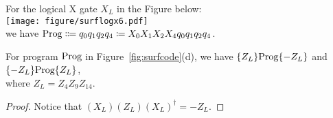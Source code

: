 \begin{program} For the logical X gate $X_L$ in the Figure below:\\
\texttt{[image: figure/surflogx6.pdf]} \\
we have $\text{Prog} \Coloneqq q_0q_1q_2q_4 \coloneqq X_{0}X_{1}X_{2}X_{4}q_0q_1q_2q_4$.
\end{program}

\begin{proposition}
For program $\text{Prog}$ in Figure~\ref{fig:surfcode}(d), we have  $\{Z_L\}\text{Prog}\{-Z_L\}$ and $\{-Z_L\}\text{Prog}\{Z_L\}$, \\
where $Z_L = Z_4Z_9Z_{14}$.
\end{proposition}
\begin{proof}
	Notice that $(X_L)(Z_L)(X_L)^\dagger = -Z_L$.
\end{proof}

